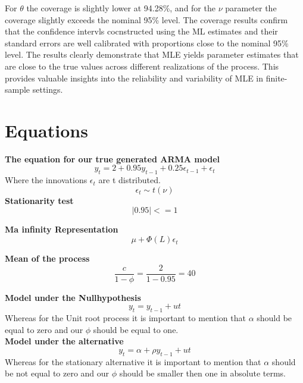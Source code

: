 \documentclass[12pt]{article}
\begin{document}
For $\theta$ the coverage is slightly lower at 94.28\%, and for the $\nu$ parameter the coverage slightly exceeds the nominal 95\% level.
The coverage results confirm that the confidence intervls cocnstructed using the ML estimates and their standard errors are well calibrated with proportions close to the nominal 95\% level.
The results clearly demonstrate that MLE yields parameter estimates that are close to the true values across different realizations of the process. This provides valuable insights into the reliability and variability of MLE in finite-sample settings.












\newpage
\section{Equations}
\textbf{The equation for our true generated ARMA model}
\begin{equation}
    y_t = 2 + 0.95y_{t-1} + 0.25\epsilon_{t-1} + \epsilon_t
\label{eq:arma}
\end{equation}
Where the innovations $\epsilon_t$ are t distributed.
 \begin{equation}
     \epsilon_t \sim t(\nu) 
 \end{equation}
\textbf{Stationarity test}
\begin{equation}
    |0.95| <= 1
    \label{eq:stat}
\end{equation}

\textbf{Ma infinity Representation}
 \begin{equation}
    \mu + \Phi(L)\epsilon_t
    \label{eq:Mainf}
 \end{equation}

 \textbf{Mean of the process}
 \begin{equation}
\frac{c}{1-\phi} = \frac{2}{1-0.95} = 40
\label{eq:Mean}
\end{equation}

\textbf{Model under the Nullhypothesis}
\begin{equation}
    y_t = y_{t-1} + ut
    \label{eq:true}
\end{equation}
Whereas for the Unit root process it is important to mention that $\alpha$ should be equal to zero and our $\phi$ should be equal to one.\\

\textbf{Model under the alternative}
\begin{equation}
    y_t = \alpha + \rho y_{t-1} + ut
    \label{eq:alternative}
\end{equation}
Whereas for the stationary alternative it is important to mention that $\alpha$ should be not equal to zero and our $\phi$ should be smaller then one in absolute terms.\\
\end{document}
